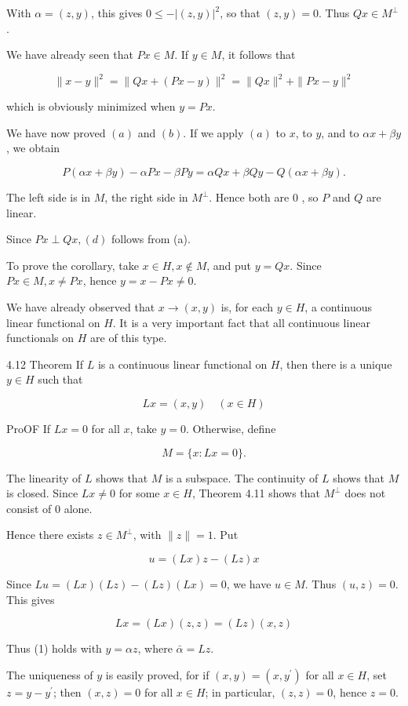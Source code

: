 \documentclass[10pt]{article}
\begin{document}
With $\alpha=(z, y)$, this gives $0 \leq-|(z, y)|^{2}$, so that $(z, y)=0$. Thus $Q x \in M^{\perp}$.

We have already seen that $P x \in M$. If $y \in M$, it follows that

$$
\|x-y\|^{2}=\|Q x+(P x-y)\|^{2}=\|Q x\|^{2}+\|P x-y\|^{2}
$$

which is obviously minimized when $y=P x$.

We have now proved $(a)$ and $(b)$. If we apply $(a)$ to $x$, to $y$, and to $\alpha x+\beta y$, we obtain

$$
P(\alpha x+\beta y)-\alpha P x-\beta P y=\alpha Q x+\beta Q y-Q(\alpha x+\beta y) .
$$

The left side is in $M$, the right side in $M^{\perp}$. Hence both are 0 , so $P$ and $Q$ are linear.

Since $P x \perp Q x,(d)$ follows from (a).

To prove the corollary, take $x \in H, x \notin M$, and put $y=Q x$. Since $P x \in M, x \neq P x$, hence $y=x-P x \neq 0$.

We have already observed that $x \rightarrow(x, y)$ is, for each $y \in H$, a continuous linear functional on $H$. It is a very important fact that all continuous linear functionals on $H$ are of this type.

4.12 Theorem If $L$ is a continuous linear functional on $H$, then there is a unique $y \in H$ such that

$$
L x=(x, y) \quad(x \in H)
$$

ProOF If $L x=0$ for all $x$, take $y=0$. Otherwise, define

$$
M=\{x: L x=0\} .
$$

The linearity of $L$ shows that $M$ is a subspace. The continuity of $L$ shows that $M$ is closed. Since $L x \neq 0$ for some $x \in H$, Theorem 4.11 shows that $M^{\perp}$ does not consist of 0 alone.

Hence there exists $z \in M^{\perp}$, with $\|z\|=1$. Put

$$
u=(L x) z-(L z) x
$$

Since $L u=(L x)(L z)-(L z)(L x)=0$, we have $u \in M$. Thus $(u, z)=0$. This gives

$$
L x=(L x)(z, z)=(L z)(x, z)
$$

Thus (1) holds with $y=\alpha z$, where $\bar{\alpha}=L z$.

The uniqueness of $y$ is easily proved, for if $(x, y)=\left(x, y^{\prime}\right)$ for all $x \in H$, set $z=y-y^{\prime}$; then $(x, z)=0$ for all $x \in H$; in particular, $(z, z)=0$, hence $z=0$.
\end{document}
